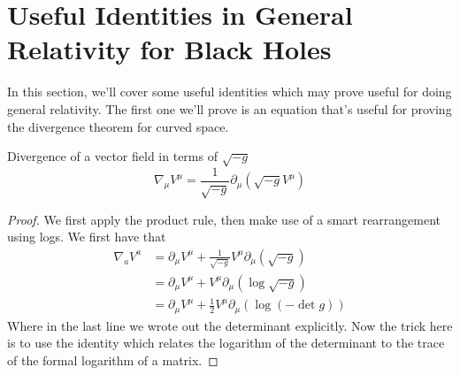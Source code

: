\section{Useful Identities in General Relativity for Black Holes} 

In this section, we'll cover 
some useful identities which may prove useful for 
doing general relativity.
The first one we'll prove is an equation that's useful for 
proving the divergence theorem for curved space. 

\begin{thm}{Divergence of a vector field in terms of $\sqrt{ - g }  $}
	\begin{equation}
		\nabla _ \mu V ^ \mu = \frac{1}{\sqrt{ - g }  } \partial  _ \mu \left( 
		\sqrt{ - g}  V ^ \mu \right)  
	\end{equation}
\begin{proof}
	We first apply the product rule, then 
	make use of a smart rearrangement using logs. 
	We first have that
	\begin{align*}
		\nabla _ a V ^ a  & = \partial  _ \mu V ^ \mu + 
		\frac{1}{\sqrt{- g}  } V ^ \mu \partial  _ \mu \left( \sqrt{ - g }    \right) \\
				  &=  \partial  _ \mu V ^ \mu + V ^ \mu \partial  _ \mu \left( \log \sqrt{ - g }   \right) \\
				  &=  \partial  _ \mu V ^ \mu + \frac{1}{2 } V ^ \mu \partial  _ \mu \left( \log \left(  - \det g  \right)   \right)  
	\end{align*}
	Where in the last line we wrote out the determinant 
	explicitly. 
	Now the trick here is to use the identity which 
	relates the logarithm of the determinant to the trace of 
	the formal logarithm of a matrix.


\end{proof}
\end{thm}
